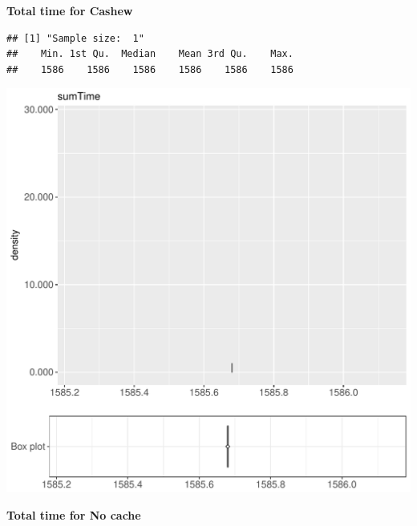\documentclass{article}\usepackage[]{graphicx}\usepackage[]{color}
\makeatletter
\def\maxwidth{ %
  \ifdim\Gin@nat@width>\linewidth
    \linewidth
  \else
    \Gin@nat@width
  \fi
}
\newenvironment{kframe}{%
 \def\at@end@of@kframe{}%
 \ifinner\ifhmode%
  \def\at@end@of@kframe{\end{minipage}}%
  \begin{minipage}{\columnwidth}%
 \fi\fi%
 \def\FrameCommand##1{\hskip\@totalleftmargin \hskip-\fboxsep
 \colorbox{shadecolor}{##1}\hskip-\fboxsep
     \hskip-\linewidth \hskip-\@totalleftmargin \hskip\columnwidth}%
 \MakeFramed {\advance\hsize-\width
   \@totalleftmargin\z@ \linewidth\hsize
   \@setminipage}}%
 {\par\unskip\endMakeFramed%
 \at@end@of@kframe}
\newenvironment{knitrout}{}{} %
\makeatother
\begin{document}
 \textbf{Total time for Cashew}
\begin{knitrout}
\color{fgcolor}\begin{kframe}
\begin{verbatim}
## [1] "Sample size:  1"
##    Min. 1st Qu.  Median    Mean 3rd Qu.    Max. 
##    1586    1586    1586    1586    1586    1586
\end{verbatim}


{\ttfamily\noindent\bfseries{}}\end{kframe}
\includegraphics[width=\maxwidth]{figure/RH1_cashew_crime-1} 

\end{knitrout}
 \textbf{Total time for No cache}
\end{document}
